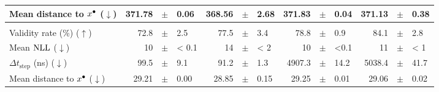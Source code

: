 \documentclass[../main.tex]{subfiles}
\begin{document}
\begin{adjustwidth}{-2.7in}{-3in}
\begin{center}
\begin{tabular}{lrllrllrllrll}
			Mean distance to $x^\bullet$ ($\downarrow$) & 371.78                                     & $\pm$                                                             & 0.06                   & 368.56                  & $\pm$ & 2.68    & 371.83 & $\pm$ & 0.04  & 371.13  & $\pm$ & 0.38    \\
			\midrule
			                                               & \multicolumn{12}{c}{\WineQuality}                                                                                                                                                                                                        \\
			\cmidrule(lr){2-13}
			Validity rate (\%) ($\uparrow$)                & 72.8                                       & $\pm$                                                             & 2.5                    & 77.5                    & $\pm$ & 3.4     & 78.8   & $\pm$ & 0.9   & 84.1    & $\pm$ & 2.8     \\
			Mean $\text{NLL}$ ($\downarrow$)                     & 10                                         & $\pm$                                                             & < 0.1                  & 14                      & $\pm$ & < 2     & 10     & $\pm$ & <0.1  & 11      & $\pm$ & < 1     \\
			$\Delta t_\text{step}$ (ns) ($\downarrow$)     & 99.5                                       & $\pm$                                                             & 9.1                    & 91.2                    & $\pm$ & 1.3     & 4907.3 & $\pm$ & 14.2  & 5038.4  & $\pm$ & 41.7    \\
			Mean distance to $x^\bullet$ ($\downarrow$) & 29.21                                      & $\pm$                                                             & 0.00                   & 28.85                   & $\pm$ & 0.15    & 29.25  & $\pm$ & 0.01  & 29.06   & $\pm$ & 0.02    \\
			\bottomrule
		\end{tabular}
	\end{center}
\end{adjustwidth}
\end{document}
